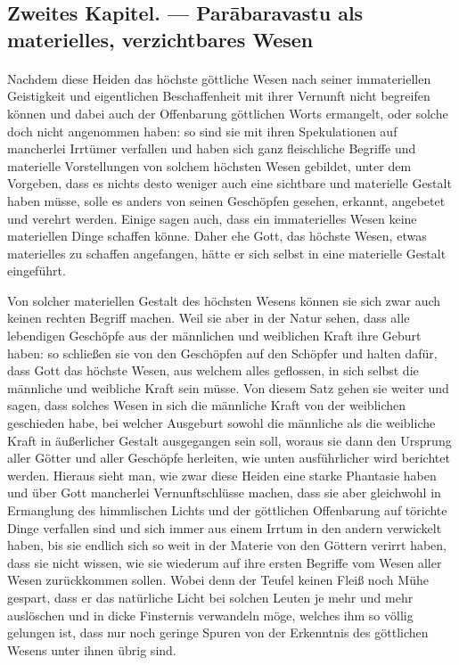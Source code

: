 \documentclass{article}
\begin{document}
\subsection{Zweites Kapitel. — Par\={a}baravastu als materielles, verzichtbares Wesen}
\paragraph{}
Nachdem diese Heiden das höchste göttliche Wesen nach seiner immateriellen Geistigkeit und eigentlichen Beschaffenheit mit ihrer Vernunft nicht begreifen können und dabei auch der Offenbarung göttlichen Worts ermangelt, oder solche doch nicht angenommen haben: so sind sie mit ihren Spekulationen auf mancherlei Irrtümer verfallen und haben sich ganz fleischliche Begriffe und materielle Vorstellungen von solchem höchsten Wesen gebildet, unter dem Vorgeben, dass es nichts desto weniger auch eine sichtbare und materielle Gestalt haben müsse, solle es anders von seinen Geschöpfen gesehen, erkannt, angebetet und verehrt werden. Einige sagen auch, dass ein immaterielles Wesen keine materiellen Dinge schaffen könne. Daher ehe Gott, das höchste Wesen, etwas materielles zu schaffen angefangen, hätte er sich selbst in eine materielle Gestalt eingeführt.

Von solcher materiellen Gestalt des höchsten Wesens können sie sich zwar auch keinen rechten Begriff machen. Weil sie aber in der Natur sehen, dass alle lebendigen Geschöpfe aus der männlichen und weiblichen Kraft ihre Geburt haben: so schließen sie von den Geschöpfen auf den Schöpfer und halten dafür, dass Gott das höchste Wesen, aus welchem alles geflossen, in sich selbst die männliche und weibliche Kraft sein müsse. Von diesem Satz gehen sie weiter und sagen, dass solches Wesen in sich die männliche Kraft von der weiblichen geschieden habe, bei welcher Ausgeburt sowohl die männliche als die weibliche Kraft in äußerlicher Gestalt ausgegangen sein soll, woraus sie dann den Ursprung aller Götter und aller Geschöpfe herleiten, wie unten ausführlicher wird berichtet werden. Hieraus sieht man, wie zwar diese Heiden eine starke Phantasie haben und über Gott mancherlei Vernunftschlüsse machen, dass sie aber gleichwohl in Ermanglung des himmlischen Lichts und der göttlichen Offenbarung auf törichte Dinge verfallen sind und sich immer aus einem Irrtum in den andern verwickelt haben, bis sie endlich sich so weit in der Materie von den Göttern verirrt haben, dass sie nicht wissen, wie sie wiederum auf ihre ersten Begriffe vom Wesen aller Wesen zurückkommen sollen. Wobei denn der Teufel keinen Fleiß noch Mühe gespart, dass er das natürliche Licht bei solchen Leuten je mehr und mehr auslöschen und in dicke Finsternis verwandeln möge, welches ihm so völlig gelungen ist, dass nur noch geringe Spuren von der Erkenntnis des göttlichen Wesens unter ihnen übrig sind.
\end{document}

